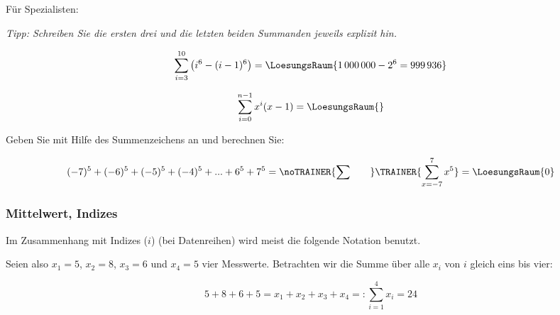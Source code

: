 Für Spezialisten:

\textit{Tipp: Schreiben Sie die ersten drei und die letzten beiden Summanden
  jeweils explizit hin.}

$$\sum_{i=3}^{10}\left(i^6 - ( i-1 )^6\right) = \LoesungsRaum{1\,000\,000 - 2^6 = 999\,936}$$
  


$$\sum_{i=0}^{n-1}x^i(x-1)=\LoesungsRaum{}$$


\newpage


Geben Sie mit Hilfe des Summenzeichens an und berechnen Sie:

$$(-7)^5 + (-6)^5 + (-5)^5 + (-4)^5 + ... + 6^5+7^5= \noTRAINER{\sum_{}^{}\hspace{7mm}}\TRAINER{\sum_{x=-7}^{7}x^5}
= \LoesungsRaum{0}$$



\newpage



\subsubsection{Mittelwert, Indizes}
Im Zusammenhang mit Indizes ($i$) (\zB bei Datenreihen) wird meist die
folgende Notation benutzt.

Seien also $x_1=5$, $x_2=8$, $x_3=6$ und $x_4=5$ vier
Messwerte. Betrachten wir die Summe über
alle $x_i$ von $i$ gleich eins bis vier:

$$5+8+6+5 = x_1 + x_2 + x_3 + x_4 =: \sum_{i=1}^4{x_i}=24$$


